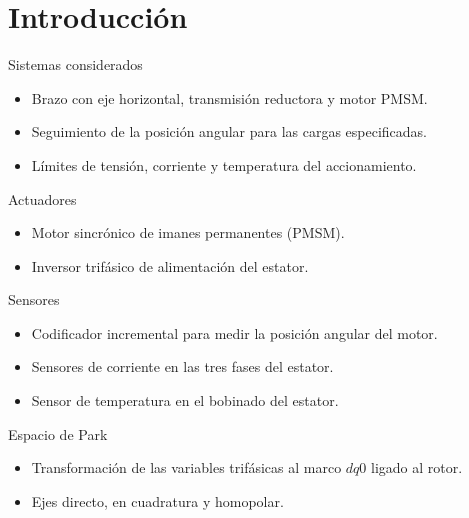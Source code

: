 \documentclass{beamer}
\begin{document}
\section{Introducción}

\begin{frame}{Sistemas considerados}
  \begin{itemize}
    \item Brazo con eje horizontal, transmisión reductora y motor PMSM.
    \item Seguimiento de la posición angular para las cargas especificadas.
    \item Límites de tensión, corriente y temperatura del accionamiento.
  \end{itemize}
\end{frame}

\begin{frame}{Actuadores}
  \begin{itemize}
    \item Motor sincrónico de imanes permanentes (PMSM).
    \item Inversor trifásico de alimentación del estator.
  \end{itemize}
\end{frame}

\begin{frame}{Sensores}
  \begin{itemize}
    \item Codificador incremental para medir la posición angular del motor.
    \item Sensores de corriente en las tres fases del estator.
    \item Sensor de temperatura en el bobinado del estator.
  \end{itemize}
\end{frame}

\begin{frame}{Espacio de Park}
  \begin{itemize}
    \item Transformación de las variables trifásicas al marco $dq0$ ligado al rotor.
    \item Ejes directo, en cuadratura y homopolar.
  \end{itemize}
\end{frame}
\end{document}
